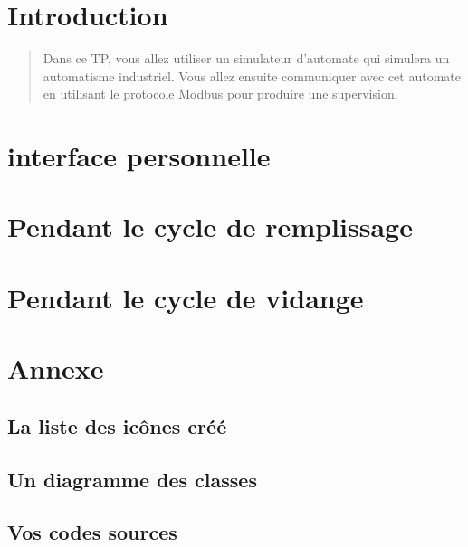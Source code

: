 \documentclass{article}
\begin{document}
\section{Introduction}
\begin{quote}
    Dans ce TP, vous allez utiliser un simulateur d'automate qui simulera un automatisme industriel. Vous allez ensuite communiquer avec cet automate en utilisant le protocole Modbus pour produire une supervision.
\end{quote}

\section{ interface personnelle}

\section{Pendant le cycle de remplissage}

\section{Pendant le cycle de vidange}

\section{Annexe}
\subsection{La liste des icônes créé}


\subsection{Un diagramme des classes}

\subsection{ Vos codes sources}


\end{document}
